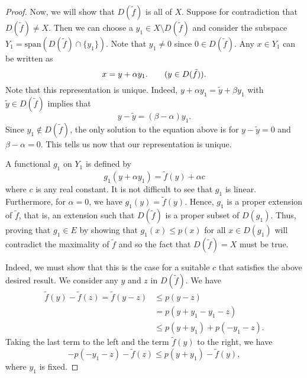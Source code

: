 \begin{proof}
Now, we will show that \( D(\tilde{f}) \) is all of \( X  \). Suppose for contradiction that \( D(\tilde{f}) \neq X  \). Then we can choose a \( {y}_{1} \in X \setminus  D(\tilde{f}) \) and consider the subspace \( {Y}_{1} = \text{span}(D(\tilde{f}) \cap \{ {y}_{1} \} ) \). Note that \( {y}_{1} \neq 0  \) since \( 0 \in D(\tilde{f}) \). Any \( x \in {Y}_{1} \) can be written as  
\[  x = y + \alpha {y}_{1}. \tag{\( y \in D(\tilde{f}) \)}. \]
Note that this representation is unique. Indeed, \( y + \alpha {y}_{1} = \tilde{y} + \beta {y}_{1} \) with \( \tilde{y} \in D(\tilde{f}) \) implies that 
\[  y - \tilde{y} = (\beta - \alpha) {y}_{1}. \]
Since \( {y}_{1} \notin D(\tilde{f}) \), the only solution to the equation above is for \( y - \tilde{y} = 0  \) and \(  \beta - \alpha = 0  \). This tells us now that our representation is unique.

    A functional \( {g}_{1} \) on \( {Y}_{1} \) is defined by 
    \[  {g}_{1}(y + \alpha {y}_{1}) = \tilde{f}(y) + \alpha c \]
    where \( c  \) is any real constant. It is not difficult to see that \( {g}_{1}  \) is linear. Furthermore, for \( \alpha = 0  \), we have \( {g}_{1}(y) = \tilde{f}(y) \). Hence, \( {g}_{1} \) is a proper extension of \( \tilde{f} \), that is, an extension such that \( D(\tilde{f}) \) is a proper subset of \( D({g}_{1}) \). Thus, proving that \( {g}_{1} \in E  \) by showing that \( {g}_{1}(x) \leq p(x) \) for all \( x \in D({g}_{1}) \) will contradict the maximality of \( \tilde{f} \) and so the fact that \( D(\tilde{f}) = X  \) must be true.

    Indeed, we must show that this is the case for a suitable \( c  \) that satisfies the above desired result. We consider any \( y  \) and \( z  \) in \( D(\tilde{f}) \). We have 
    \begin{align*}
        \tilde{f}(y) - \tilde{f}(z) = \tilde{f}(y- z) &\leq p(y-z)  \\
                                                      &= p(y + {y}_{1} - {y}_{1} - z ) \\
                                                      &\leq p(y + {y}_{1}) + p(-{y}_{1} - z).
    \end{align*}
    Taking the last term to the left and the term \( \tilde{f}(y) \) to the right, we have 
    \[  - p(- {y}_{1} - z ) - \tilde{f}(z) \leq p(y + {y}_{1}) - \tilde{f}(y), \]
    where \( {y}_{1} \) is fixed. 

\end{proof}
